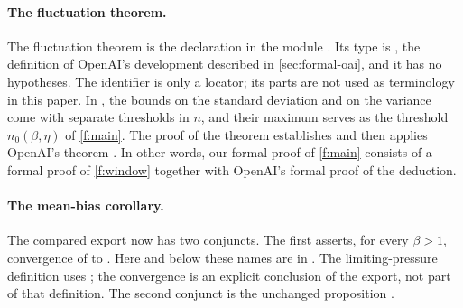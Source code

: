 \paragraph{The fluctuation theorem.} The fluctuation theorem is the declaration
in the module . Its type is , the definition of OpenAI's development described in \cref{sec:formal-oai}, and it has no hypotheses. The identifier is only a locator; its parts are not used as terminology in this paper. In , the bounds on the standard deviation and on the variance come with separate thresholds in $n$, and their maximum serves as the threshold $n_0(\beta,\eta)$ of \cref{f:main}. The proof of the theorem establishes  and then applies OpenAI's theorem . In other words, our formal proof of \cref{f:main} consists of a formal proof of \cref{f:window} together with OpenAI's formal proof of the deduction.

\paragraph{The mean-bias corollary.} The compared export
 now has two conjuncts. The first
asserts, for every $\beta>1$, convergence of
 to
. Here and below these names are in
. The limiting-pressure definition uses
; the convergence is an explicit conclusion of the
export, not part of that definition. The second conjunct is the unchanged
proposition .

